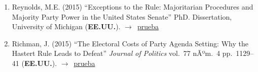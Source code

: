 \documentclass[12 pt, letter]{article}
\newenvironment{CitasMiTrabajo}{
    \begin{footnotesize}
    \begin{enumerate}[label={\footnotesize\emph{cita~\arabic*}},ref=\arabic*] %
        \setlength{\itemsep}{.1\itemsep}
        \setlength{\parskip}{.1\parskip}
    }{\end{enumerate}\end{footnotesize}}
\begin{document}
\begin{CitasMiTrabajo}
        \item Reynolds, M.E. (2015) ``Exceptions to the Rule: Majoritarian Procedures and Majority Party Power in the United States Senate'' PhD. Dissertation, University of Michigan (\textbf{EE.UU.}). $\rightarrow$~\href{http://ericmagar.com/cv/cites/coxMagar/reynolds2015.pdf}{prueba}

        \item Richman, J. (2015) ``The Electoral Costs of Party Agenda Setting: Why the Hastert Rule Leads to Defeat'' \emph{Journal of Politics} vol.\ 77 nÃºm.\ 4 pp.\ 1129--41 (\textbf{EE.UU.}). $\rightarrow$~\href{http://ericmagar.com/cv/cites/coxMagar/richmanEllCosts2015jop.pdf}{prueba}


        \label{ncites:cox.magar.1999} %


\end{CitasMiTrabajo}
\end{document}
